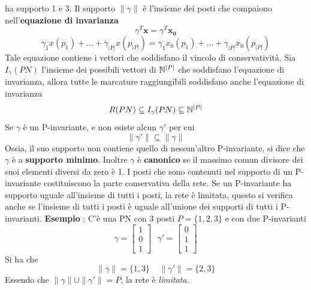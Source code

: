 \documentclass[10pt, letterpaper]{report}
\begin{document}
ha supporto 1 e 3. Il supporto $\|\gamma\|$ è l'insieme dei posti che compaiono nell'\textbf{equazione di invarianza}
$$ \gamma^T\mathbf x=\gamma^T\mathbf{x_0}$$
$$ \gamma_1x(p_1)+\dots + \gamma_{|P|}x(p_{|P|})= \gamma_1x_0(p_1)+\dots + \gamma_{|P|}x_0(p_{|P|})$$
Tale equazione contiene i vettori che soddisfano il vincolo di conservatività.
Sia $I_{\gamma}(PN)$ l'insieme dei possibili vettori di ${\mathbb N}^{|P|}$ che soddisfano l'equazione di invarianza, allora tutte le marcature raggiungibili soddisfano anche l'equazione di invarianza 
$$ R(PN)\subseteq I_{\gamma}(PN) \subseteq {\mathbb N}^{|P|}$$
Se $\gamma$ è un P-invariante, e non esiste alcun $\gamma'$ per cui $$\|\gamma'\|\subseteq\|\gamma\| $$
Ossia, il suo supporto non contiene quello di nessun'altro P-invariante, si dice che $\gamma$ è a \textbf{supporto minimo}. Inoltre $\gamma$ è \textbf{canonico} se il massimo comun divisore dei suoi elementi diversi da zero è 1.
\acc 
I posti che sono contenuti nel supporto di un P-invariante costituiscono la parte conservativa della rete. Se un P-invariante ha supporto uguale all'insieme di tutti i posti, la rete è limitata, questo si verifica anche se l'insieme di tutti i posti è uguale all'unione dei supporti di tutti i P-invarianti.\acc 
\textbf{Esempio} : C'è una PN con 3 posti $P=\{1,2,3\}$  e con due P-invarianti 
$$\gamma=\begin{bmatrix}
    1 \\ 0 \\ 1
\end{bmatrix}  \ \ \ \gamma'=\begin{bmatrix}
    0 \\ 1 \\ 1
\end{bmatrix}$$
Si ha che 
$$ \|\gamma\|=\{1,3\} \ \ \ \ \ \|\gamma'\|=\{2,3\}$$
Essendo che $\|\gamma\|\cup \|\gamma'\| = P$, la rete è \textit{limitata}. 
\end{document}
